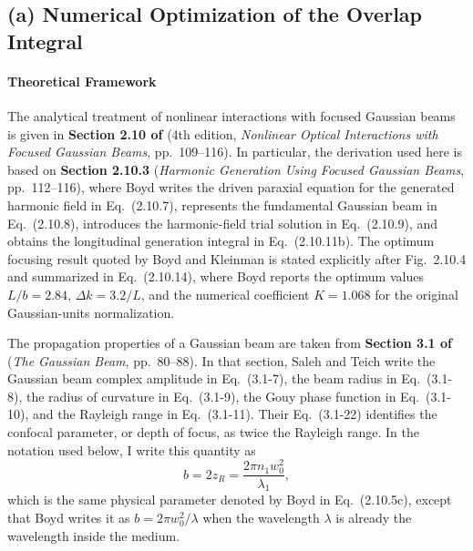 \begin{resolucao}[Solution]

\subsection*{(a) Numerical Optimization of the Overlap Integral}

    \paragraph*{Theoretical Framework}
        The analytical treatment of nonlinear interactions with focused Gaussian beams is given in \textbf{Section 2.10 of } (4th edition, \textit{Nonlinear Optical Interactions with Focused Gaussian Beams}, pp.~109--116). In particular, the derivation used here is based on \textbf{Section 2.10.3} (\textit{Harmonic Generation Using Focused Gaussian Beams}, pp.~112--116), where Boyd writes the driven paraxial equation for the generated harmonic field in Eq.~(2.10.7), represents the fundamental Gaussian beam in Eq.~(2.10.8), introduces the harmonic-field trial solution in Eq.~(2.10.9), and obtains the longitudinal generation integral in Eq.~(2.10.11b). The optimum focusing result quoted by Boyd and Kleinman is stated explicitly after Fig.~2.10.4 and summarized in Eq.~(2.10.14), where Boyd reports the optimum values $L/b=2.84$, $\Delta k=3.2/L$, and the numerical coefficient $K=1.068$ for the original Gaussian-units normalization.
    
        The propagation properties of a Gaussian beam are taken from \textbf{Section 3.1 of } (\textit{The Gaussian Beam}, pp.~80--88). In that section, Saleh and Teich write the Gaussian beam complex amplitude in Eq.~(3.1-7), the beam radius in Eq.~(3.1-8), the radius of curvature in Eq.~(3.1-9), the Gouy phase function in Eq.~(3.1-10), and the Rayleigh range in Eq.~(3.1-11). Their Eq.~(3.1-22) identifies the confocal parameter, or depth of focus, as twice the Rayleigh range. In the notation used below, I write this quantity as
        \begin{equation}
            b = 2z_R = \frac{2\pi n_1 w_0^2}{\lambda_1},
            \label{eq:confocal_parameter_saleh}
        \end{equation}
        which is the same physical parameter denoted by Boyd in Eq.~(2.10.5c), except that Boyd writes it as $b=2\pi w_0^2/\lambda$ when the wavelength $\lambda$ is already the wavelength inside the medium.


\end{resolucao}
